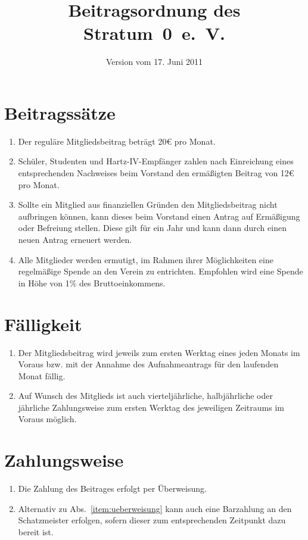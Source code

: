 \documentclass[a4paper,12pt]{scrartcl}
\title{Beitragsordnung des Stratum~0~e.~V.}
\date{Version vom 17. Juni 2011}
\begin{document}
\maketitle

\section{Beitragssätze}
\begin{enumerate}
  \item Der reguläre Mitgliedsbeitrag beträgt 20€ pro Monat.
  \item Schüler, Studenten und Hartz-IV-Empfänger zahlen nach Einreichung eines
    entsprechenden Nachweises beim Vorstand den ermäßigten Beitrag von 12€ pro
    Monat.
  \item Sollte ein Mitglied aus finanziellen Gründen den Mitgliedsbeitrag nicht
    aufbringen können, kann dieses beim Vorstand einen Antrag auf Ermäßigung
    oder Befreiung stellen. Diese gilt für ein Jahr und kann dann durch einen
    neuen Antrag erneuert werden.
  \item Alle Mitglieder werden ermutigt, im Rahmen ihrer Möglichkeiten eine
    regelmäßige Spende an den Verein zu entrichten. Empfohlen wird eine Spende
    in Höhe von 1\% des Bruttoeinkommens.
\end{enumerate}

\section{Fälligkeit}
\begin{enumerate}
  \item Der Mitgliedsbeitrag wird jeweils zum ersten Werktag eines jeden Monats
    im Voraus bzw. mit der Annahme des Aufnahmeantrags für den laufenden Monat
    fällig.
  \item Auf Wunsch des Mitglieds ist auch vierteljährliche, halbjährliche oder
    jährliche Zahlungsweise zum ersten Werktag des jeweiligen Zeitraums im
    Voraus möglich.
\end{enumerate}

\section{Zahlungsweise}
\begin{enumerate}
  \item\label{item:ueberweisung} Die Zahlung des Beitrages erfolgt per Überweisung.
  \item Alternativ zu Abs.~\ref{item:ueberweisung} kann auch eine Barzahlung an den
    Schatzmeister erfolgen, sofern dieser zum entsprechenden Zeitpunkt dazu
    bereit ist.
\end{enumerate}
\end{document}

